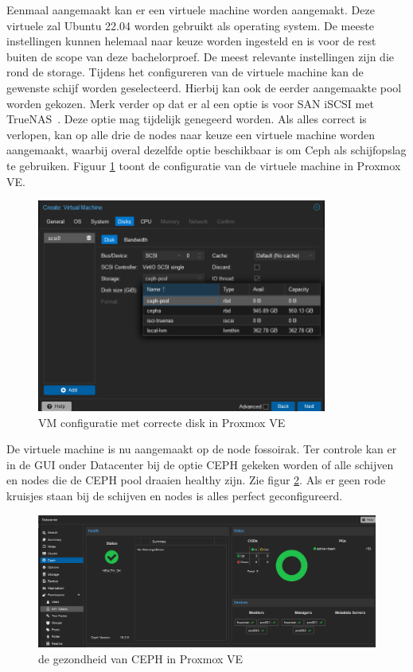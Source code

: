Eenmaal aangemaakt kan er een virtuele machine worden aangemakt. Deze virtuele zal Ubuntu 22.04 worden gebruikt als operating system.
De meeste instellingen kunnen helemaal naar keuze worden ingesteld en is voor de rest buiten de scope van deze bachelorproef. De meest relevante instellingen zijn die rond de storage.
Tijdens het configureren van de virtuele machine kan de gewenste schijf worden geselecteerd. Hierbij kan ook de eerder aangemaakte pool worden gekozen.
Merk verder op dat er al een optie is voor SAN iSCSI met TrueNAS~\autocite{truenas}. Deze optie mag tijdelijk genegeerd worden.
Als alles correct is verlopen, kan op alle drie de nodes naar keuze een virtuele machine worden aangemaakt, waarbij overal dezelfde optie beschikbaar is om Ceph als schijfopslag te gebruiken.
Figuur \ref{fig:vm-storage-proxmox} toont de configuratie van de virtuele machine in Proxmox VE.
\begin{figure}[H]
  \centering
  \includegraphics[width=0.85\textwidth, trim=3cm 0cm 3cm 0cm, clip]{../poc/vm-storage-prox.png}
  \caption{VM configuratie met correcte disk in Proxmox VE}
  \label{fig:vm-storage-proxmox}
\end{figure}

De virtuele machine is nu aangemaakt op de node fossoirak.
Ter controle kan er in de GUI onder Datacenter bij de optie CEPH gekeken worden of alle schijven en nodes die de CEPH pool draaien healthy zijn. Zie figur \ref{fig:ceph-healthy-prox}.
Als er geen rode kruisjes staan bij de schijven en nodes is alles perfect geconfigureerd.
\begin{figure}[H]
  \centering
  \includegraphics[width=1.1\textwidth]{../poc/ceph-healthy-prox.png}
  \caption{de gezondheid van CEPH  in Proxmox VE}
  \label{fig:ceph-healthy-prox}
\end{figure}

